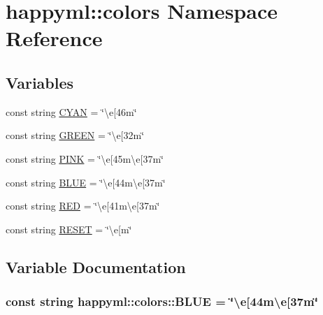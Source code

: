 \hypertarget{namespacehappyml_1_1colors}{}\section{happyml\+:\+:colors Namespace Reference}
\label{namespacehappyml_1_1colors}
\subsection*{Variables}
\begin{DoxyCompactItemize}
\item 
const string \hyperlink{namespacehappyml_1_1colors_a11d5d83dc04c05bb83a9818de86ad63e}{C\+Y\+AN} = \char`\"{}\textbackslash{}e\mbox{[}46m\char`\"{}
\item 
const string \hyperlink{namespacehappyml_1_1colors_ad37054e800edc077c369046fbf1964b4}{G\+R\+E\+EN} = \char`\"{}\textbackslash{}e\mbox{[}32m\char`\"{}
\item 
const string \hyperlink{namespacehappyml_1_1colors_a18cdb6ebba3b1cf1716820ca55594f38}{P\+I\+NK} = \char`\"{}\textbackslash{}e\mbox{[}45m\textbackslash{}e\mbox{[}37m\char`\"{}
\item 
const string \hyperlink{namespacehappyml_1_1colors_ab5d52b4fdffea05cf265ca5d05ba1c84}{B\+L\+UE} = \char`\"{}\textbackslash{}e\mbox{[}44m\textbackslash{}e\mbox{[}37m\char`\"{}
\item 
const string \hyperlink{namespacehappyml_1_1colors_a7dd908033a249e2355f86fe520b59b8d}{R\+ED} = \char`\"{}\textbackslash{}e\mbox{[}41m\textbackslash{}e\mbox{[}37m\char`\"{}
\item 
const string \hyperlink{namespacehappyml_1_1colors_ac7bc97b2ebca85fdfbf6ffe42e53db4b}{R\+E\+S\+ET} = \char`\"{}\textbackslash{}e\mbox{[}m\char`\"{}
\end{DoxyCompactItemize}


\subsection{Variable Documentation}
\subsubsection[{\texorpdfstring{B\+L\+UE}{BLUE}}]{\setlength{\rightskip}{0pt plus 5cm}const string happyml\+::colors\+::\+B\+L\+UE = \char`\"{}\textbackslash{}e\mbox{[}44m\textbackslash{}e\mbox{[}37m\char`\"{}}\hypertarget{namespacehappyml_1_1colors_ab5d52b4fdffea05cf265ca5d05ba1c84}{}\label{namespacehappyml_1_1colors_ab5d52b4fdffea05cf265ca5d05ba1c84}
